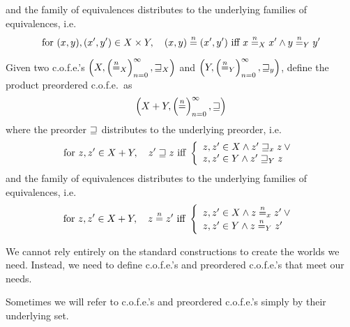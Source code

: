 \begin{jversion}
\begin{definition}
\[  \]
  and the family of equivalences distributes to the underlying families of equivalences, i.e.\
  \[
\text{for } (x,y),(x',y') \in X \times Y, \quad    (x,y) \nequal (x',y') \text{ iff } x \nequal_X x' \wedge y \nequal_Y y'
  \]
\end{definition}
\begin{definition}
  \label{def:sum-p-cofe}
  Given two c.o.f.e.'s $\left(X,\left(\nequal[n]_X\right)_{n=0}^{\infty}, \future_X \right)$ and $\left(Y,\left(\nequal[n]_Y\right)_{n=0}^{\infty}, \future_y \right)$, define the product preordered c.o.f.e.\ as
  \[
  \left(X + Y ,\left(\nequal[n]\right)_{n=0}^{\infty},\future \right)
  \]
  where the preorder $\future$ distributes to the underlying preorder, i.e.\ 
  \[
    \text{for } z,z' \in X + Y,\quad  z' \future z \text{ iff } \left\{
      \begin{array}{l}
        z,z' \in X \wedge z' \future_x z \vee{} \\
        z,z' \in Y \wedge z' \future_Y z
      \end{array}
    \right.
  \]
  and the family of equivalences distributes to the underlying families of equivalences, i.e.\
  \[
    \text{for } z,z' \in X + Y,\quad  z \nequal z' \text{ iff } \left\{
      \begin{array}{l}
        z,z' \in X \wedge z \nequal_x z' \vee{} \\
        z,z' \in Y \wedge z \nequal_Y z'
      \end{array}
    \right.
  \]
\end{definition}

We cannot rely entirely on the standard constructions to create the worlds we need.
Instead, we need to define c.o.f.e.'s and preordered c.o.f.e.'s that meet our needs.

Sometimes we will refer to c.o.f.e.'s and preordered c.o.f.e.'s simply by their underlying set.


\end{jversion}
